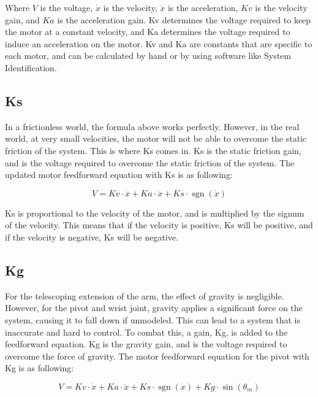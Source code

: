 \documentclass{scrartcl}
\DeclareMathOperator{\sgn}{sgn}
\begin{document}
Where \(V\) is the voltage, \(\dot{x}\) is the velocity, \(\ddot{x}\) is the acceleration, \(Kv\) is the velocity gain, and \(Ka\) is the acceleration gain. Kv determines the voltage required to keep the motor at a constant velocity, and Ka determines the voltage required to induce an acceleration on the motor. Kv and Ka are constants that are specific to each motor, and can be calculated by hand or by using software like System Identification.

\subsection{Ks}
In a frictionless world, the formula above works perfectly. However, in the real world, at very small velocities, the motor will not be able to overcome the static friction of the system. This is where Ks comes in. Ks is the static friction gain, and is the voltage required to overcome the static friction of the system. The updated motor feedforward equation with Ks is as following:

\begin{equation} \label{Motor Feedforward Equation with Static Friction}
    V = Kv \cdot \dot{x} + Ka \cdot \ddot{x} + Ks \cdot \sgn(\dot{x})
\end{equation}

Ks is proportional to the velocity of the motor, and is multiplied by the signum of the velocity. This means that if the velocity is positive, Ks will be positive, and if the velocity is negative, Ks will be negative.

\subsection{Kg}
For the telescoping extension of the arm, the effect of gravity is negligible. However, for the pivot and wrist joint, gravity applies a significant force on the system, causing it to fall down if unmodeled. This can lead to a system that is inaccurate and hard to control. To combat this, a gain, Kg, is added to the feedforward equation. Kg is the gravity gain, and is the voltage required to overcome the force of gravity. The motor feedforward equation for the pivot with Kg is as following:

\begin{equation} \label{Motor Feedforward Equation with Gravity Pivot}
    V = Kv \cdot \dot{x} + Ka \cdot \ddot{x} + Ks \cdot  \sgn(\dot{x}) + Kg \cdot \sin(\theta_{m})
\end{equation}
\end{document}
